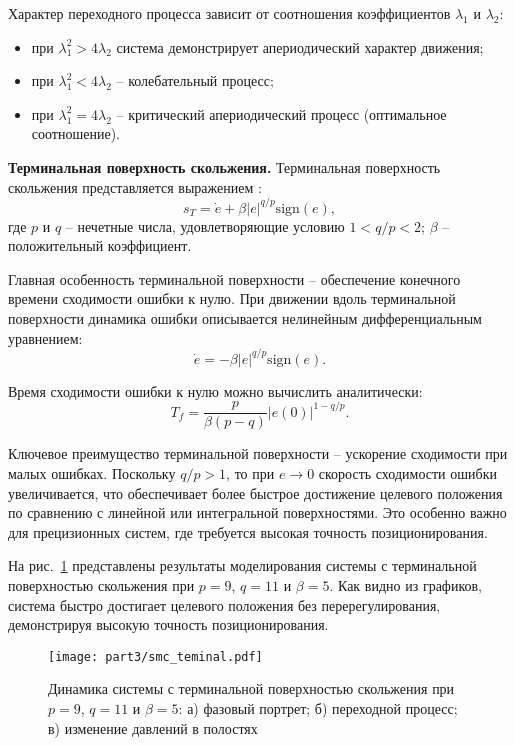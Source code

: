 Характер переходного процесса зависит от соотношения коэффициентов $\lambda_1$ и $\lambda_2$:
\begin{itemize}
	\item при $\lambda_1^2 > 4\lambda_2$ система демонстрирует апериодический характер движения;
	\item при $\lambda_1^2 < 4\lambda_2$ -- колебательный процесс;
	\item при $\lambda_1^2 = 4\lambda_2$ -- критический апериодический процесс (оптимальное соотношение).
\end{itemize}

\textbf{Терминальная поверхность скольжения.}
Терминальная поверхность скольжения представляется выражением \cite{sliding_surface_terminal}:
\begin{equation}
	s_T = \dot{e} + \beta |e|^{q/p} \text{sign}(e),
\end{equation}
где $p$ и $q$ -- нечетные числа, удовлетворяющие условию $1 < q/p < 2$; $\beta$ -- положительный коэффициент.

Главная особенность терминальной поверхности -- обеспечение конечного времени сходимости ошибки к нулю.
При движении вдоль терминальной поверхности динамика ошибки описывается нелинейным дифференциальным уравнением:
\begin{equation}
	\dot{e} = -\beta |e|^{q/p} \text{sign}(e).
\end{equation}

Время сходимости ошибки к нулю можно вычислить аналитически:
\begin{equation}
	T_f = \frac{p}{\beta(p-q)}|e(0)|^{1-q/p}.
\end{equation}

Ключевое преимущество терминальной поверхности -- ускорение сходимости при малых ошибках.
Поскольку $q/p > 1$, то при $e \to 0$ скорость сходимости ошибки увеличивается, что обеспечивает
более быстрое достижение целевого положения по сравнению с линейной или интегральной поверхностями.
Это особенно важно для прецизионных систем, где требуется высокая точность позиционирования.

На рис.~\ref{fig:smc_terminal} представлены результаты моделирования системы с терминальной
поверхностью скольжения при $p = 9$, $q = 11$ и $\beta = 5$. Как видно из графиков, система
быстро достигает целевого положения без перерегулирования, демонстрируя высокую точность позиционирования.

\begin{figure}[ht]
	\centering
	\texttt{[image: part3/smc\_teminal.pdf]}
	\caption{Динамика системы с терминальной поверхностью скольжения
		при $p=9$, $q=11$ и $\beta=5$: а) фазовый портрет; б) переходной процесс; в) изменение давлений в полостях}
	\label{fig:smc_terminal}
\end{figure}



